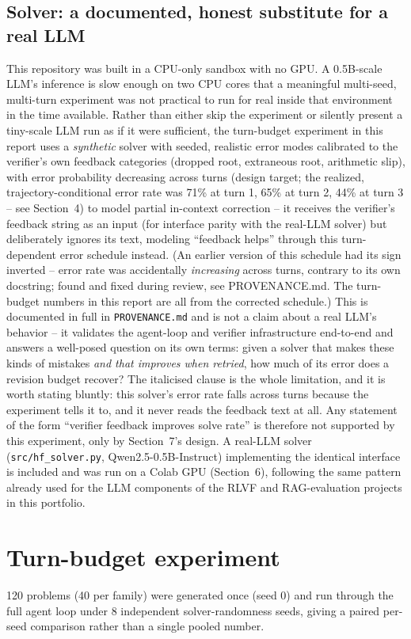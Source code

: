 \documentclass[11pt]{article}
\begin{document}
\subsection{Solver: a documented, honest substitute for a real LLM}
This repository was built in a CPU-only sandbox with no GPU. A 0.5B-scale
LLM's inference is slow enough on two CPU cores that a meaningful
multi-seed, multi-turn experiment was not practical to run for real inside
that environment in the time available. Rather than either skip the
experiment or silently present a tiny-scale LLM run as if it were
sufficient, the turn-budget experiment in this report uses a
\emph{synthetic} solver with seeded, realistic error modes calibrated to
the verifier's own feedback categories (dropped root, extraneous root,
arithmetic slip), with error probability decreasing across turns (design
target; the realized, trajectory-conditional error rate was 71\% at turn
1, 65\% at turn 2, 44\% at turn 3 -- see Section~4) to model partial in-context
correction -- it receives the verifier's feedback string as an input (for
interface parity with the real-LLM solver) but deliberately ignores its
text, modeling ``feedback helps'' through this turn-dependent error
schedule instead. (An earlier version of this schedule had its sign
inverted -- error rate was accidentally \emph{increasing} across turns,
contrary to its own docstring; found and fixed during review, see
PROVENANCE.md. The turn-budget numbers in this report are all from the
corrected schedule.) This is documented in full in
\texttt{PROVENANCE.md} and is not a claim about a real LLM's behavior --
it validates the agent-loop and verifier infrastructure end-to-end and
answers a well-posed question on its own terms: given a solver that makes
these kinds of mistakes \emph{and that improves when retried}, how much of
its error does a revision budget recover? The italicised clause is the
whole limitation, and it is worth stating bluntly: this solver's error rate
falls across turns because the experiment tells it to, and it never reads
the feedback text at all. Any statement of the form ``verifier feedback
improves solve rate'' is therefore not supported by this experiment, only
by Section~7's design. A real-LLM solver (\texttt{src/hf\_solver.py}, Qwen2.5-0.5B-Instruct)
implementing the identical interface is included and was run on a Colab
GPU (Section~6), following the same pattern already used for the LLM
components of the RLVF and RAG-evaluation projects in this portfolio.

\section{Turn-budget experiment}
120 problems (40 per family) were generated once (seed 0) and run through
the full agent loop under 8 independent solver-randomness seeds, giving a
paired per-seed comparison rather than a single pooled number.
\end{document}
